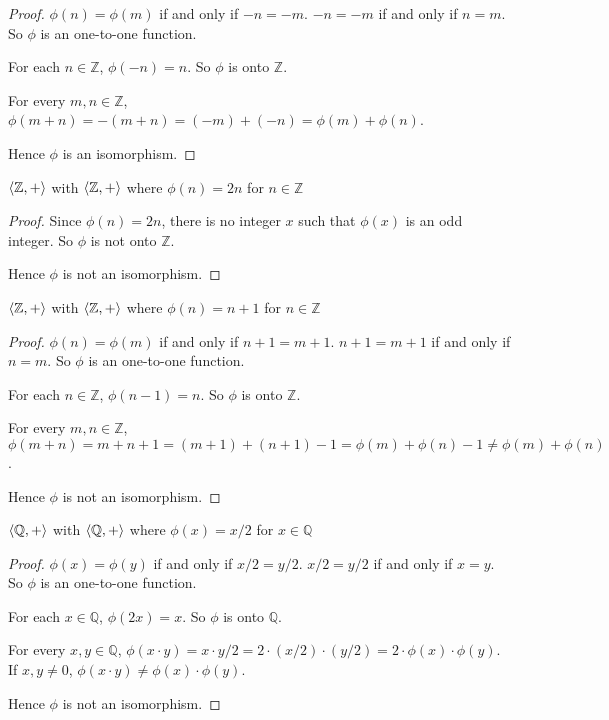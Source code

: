 \begin{proof}
    $\phi(n) = \phi(m)$ if and only if $-n = -m$. $-n = -m$ if and only if $n = m$. So $\phi$ is an one-to-one function.

    For each $n\in\mathbb{Z}$, $\phi(-n) = n$. So $\phi$ is onto $\mathbb{Z}$.

    For every $m, n\in\mathbb{Z}$, $\phi(m + n) = -(m + n) = (-m) + (-n) = \phi(m) + \phi(n)$.

    Hence $\phi$ is an isomorphism.
\end{proof}

\begin{exercise}
    $\left\langle{\mathbb{Z}, +}\right\rangle$ with $\left\langle{\mathbb{Z}, +}\right\rangle$ where $\phi(n) = 2n$ for $n\in\mathbb{Z}$
\end{exercise}

\begin{proof}
    Since $\phi(n) = 2n$, there is no integer $x$ such that $\phi(x)$ is an odd integer. So $\phi$ is not onto $\mathbb{Z}$.

    Hence $\phi$ is not an isomorphism.
\end{proof}

\begin{exercise}
    $\left\langle{\mathbb{Z}, +}\right\rangle$ with $\left\langle{\mathbb{Z}, +}\right\rangle$ where $\phi(n) = n + 1$ for $n\in\mathbb{Z}$
\end{exercise}

\begin{proof}
    $\phi(n) = \phi(m)$ if and only if $n + 1 = m + 1$. $n + 1 = m + 1$ if and only if $n = m$. So $\phi$ is an one-to-one function.

    For each $n\in\mathbb{Z}$, $\phi(n - 1) = n$. So $\phi$ is onto $\mathbb{Z}$.

    For every $m, n\in\mathbb{Z}$, $\phi(m + n) = m + n + 1 = (m + 1) + (n + 1) - 1 = \phi(m) + \phi(n) - 1 \ne \phi(m) + \phi(n)$.

    Hence $\phi$ is not an isomorphism.
\end{proof}

\begin{exercise}
    $\left\langle{\mathbb{Q}, +}\right\rangle$ with $\left\langle{\mathbb{Q}, +}\right\rangle$ where $\phi(x) = x/2$ for $x\in\mathbb{Q}$
\end{exercise}

\begin{proof}
    $\phi(x) = \phi(y)$ if and only if $x/2 = y/2$. $x/2 = y/2$ if and only if $x = y$. So $\phi$ is an one-to-one function.

    For each $x\in\mathbb{Q}$, $\phi(2x) = x$. So $\phi$ is onto $\mathbb{Q}$.

    For every $x, y\in\mathbb{Q}$, $\phi(x\cdot y) = x\cdot y/2 = 2\cdot(x/2)\cdot(y/2) = 2\cdot\phi(x)\cdot\phi(y)$. If $x, y\ne 0$, $\phi(x\cdot y) \ne \phi(x)\cdot\phi(y)$.

    Hence $\phi$ is not an isomorphism.
\end{proof}

